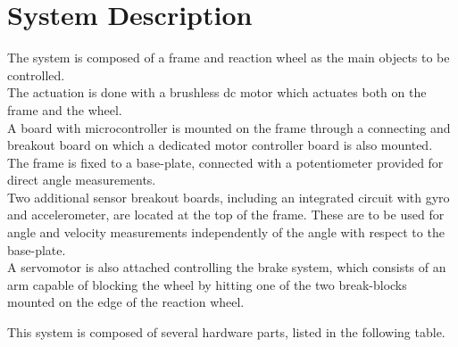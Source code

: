 \chapter{System Description}\label{systemDescription}
The system is composed of a frame and reaction wheel as the main objects to be controlled.\\ The actuation is done with a brushless dc motor which actuates both on the frame and the wheel.\\ A board with microcontroller is mounted on the frame through a connecting and breakout board on which a dedicated motor controller board is also mounted.\\ The frame is fixed to a base-plate, connected with a potentiometer provided for direct angle measurements.\\ Two additional sensor breakout boards, including an integrated circuit with gyro and accelerometer, are located at the top of the frame. These are to be used for angle and velocity measurements independently of the angle with respect to the base-plate.\\ A servomotor is also attached controlling the brake system, which consists of an arm capable of blocking the wheel by hitting one of the two break-blocks mounted on the edge of the reaction wheel.



This system is composed of several hardware parts, listed in the following table. 

